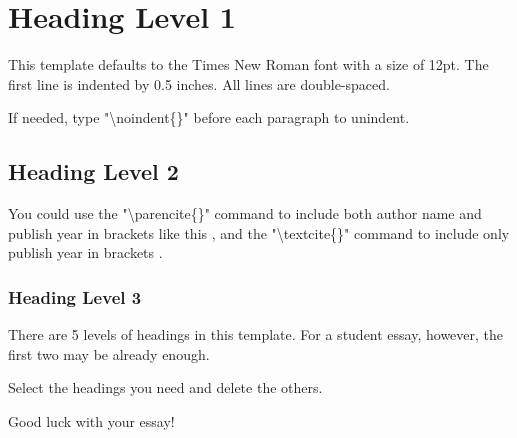 \section{Heading Level 1}

This template defaults to the Times New Roman font with a size of 12pt. The first line is indented by 0.5 inches. All lines are double-spaced. 

\noindent If needed, type "\textbackslash noindent\{\}" before each paragraph to unindent.

\subsection{Heading Level 2}

You could use the "\textbackslash parencite\{\}" command to include both author name and publish year in brackets like this \parencite{lshort}, and the "\textbackslash textcite\{\}" command to include only publish year in brackets \textcite{lshort}.

\subsubsection{Heading Level 3}

There are 5 levels of headings in this template. For a student essay, however, the first two may be already enough.

 Select the headings you need and delete the others.

 Good luck with your essay!